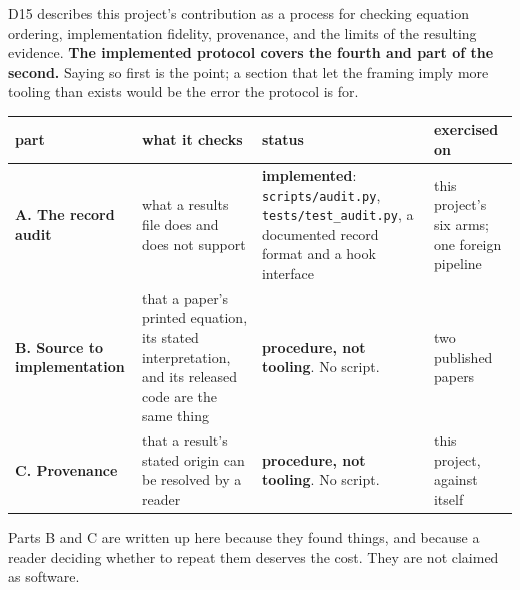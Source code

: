 \documentclass[
  10pt,
]{article}
\newcounter{none} %
\begin{document}
D15 describes this project's contribution as a process for checking
equation ordering, implementation fidelity, provenance, and the limits
of the resulting evidence. \textbf{The implemented protocol covers the
fourth and part of the second.} Saying so first is the point; a section
that let the framing imply more tooling than exists would be the error
the protocol is for.

{\def\LTcaptype{none} %
\begin{longtable}[]{@{}
  >{\raggedright\arraybackslash}p{}
  >{\raggedright\arraybackslash}p{}
  >{\raggedright\arraybackslash}p{}
  >{\raggedright\arraybackslash}p{}@{}}
\toprule\noalign{}
\begin{minipage}[b]{\linewidth}\raggedright
part
\end{minipage} & \begin{minipage}[b]{\linewidth}\raggedright
what it checks
\end{minipage} & \begin{minipage}[b]{\linewidth}\raggedright
status
\end{minipage} & \begin{minipage}[b]{\linewidth}\raggedright
exercised on
\end{minipage} \\
\midrule\noalign{}
\endhead
\bottomrule\noalign{}
\endlastfoot
\textbf{A. The record audit} & what a results file does and does not
support & \textbf{implemented}: \texttt{scripts/\allowbreak{}audit.py},
\texttt{tests/\allowbreak{}test\_\allowbreak{}audit.py}, a documented record format and a hook
interface & this project's six arms; one foreign pipeline \\
\textbf{B. Source to implementation} & that a paper's printed equation,
its stated interpretation, and its released code are the same thing &
\textbf{procedure, not tooling}. No script. & two published papers \\
\textbf{C. Provenance} & that a result's stated origin can be resolved
by a reader & \textbf{procedure, not tooling}. No script. & this
project, against itself \\
\end{longtable}
}

Parts B and C are written up here because they found things, and because
a reader deciding whether to repeat them deserves the cost. They are not
claimed as software.
\end{document}
